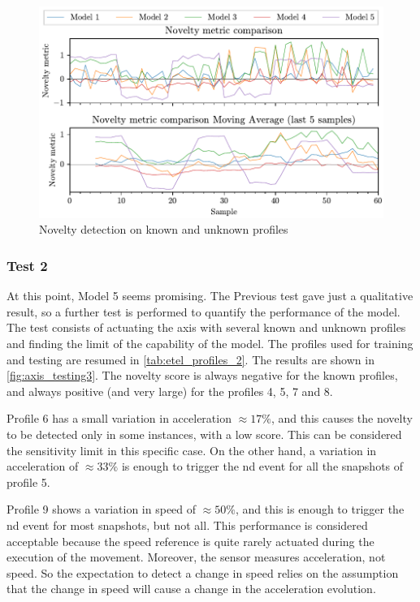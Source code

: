 \begin{figure}
    \centering
    \includegraphics{images/LinearMotor/Testing2.pdf}
    \caption{Novelty detection on known and unknown profiles}
    \label{fig:axis_testing2}
\end{figure}

\subsubsection{Test 2}
At this point, Model 5 seems promising. The Previous test gave just a qualitative result, so a further test is performed to quantify the performance of the model. The test consists of actuating the axis with several known and unknown profiles and finding the limit of the capability of the model. The profiles used for training and testing are resumed in \autoref{tab:etel_profiles_2}. The results are shown in \autoref{fig:axis_testing3}. The novelty score is always negative for the known profiles, and always positive (and very large) for the profiles 4, 5, 7 and 8. 

Profile 6 has a small variation in acceleration $\approx 17\%$, and this causes the novelty to be detected only in some instances, with a low score. This can be considered the sensitivity limit in this specific case. On the other hand, a variation in acceleration of $\approx 33\%$ is enough to trigger the \gls{nd} event for all the snapshots of profile 5. 

Profile 9 shows a variation in speed of $\approx 50\%$, and this is enough to trigger the \gls{nd} event for most snapshots, but not all. This performance is considered acceptable because the speed reference is quite rarely actuated during the execution of the movement. Moreover, the sensor measures acceleration, not speed. So the expectation to detect a change in speed relies on the assumption that the change in speed will cause a change in the acceleration evolution.

